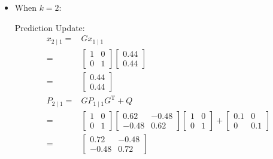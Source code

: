\documentclass[twoside]{article}
\renewcommand{\t}{^\mathrm{T}{}}
\begin{document}
\begin{itemize}
\begin{align*}
\begin{array}{c}
	\end{array}\right]\\
	P_{1\mid 1} =& P_{1\mid 0} - K_1 S_{1\mid 0}K_1\t\\
	 =& \left[ \begin{array}{cc}
	 	1.1 & 0 \\ 0 & 1.1
	 \end{array}\right]-2.5\left[ \begin{array}{c}
	 0.44 \\ 0.44
	 \end{array}\right]\left[ \begin{array}{cc}
	 0.44 & 0.44
	\end{array}\right]\\
	=&	\left[ \begin{array}{cc}
		0.62 & -0.48 \\ -0.48 & 0.62
	\end{array}\right]
	\end{align*}
\item When $k = 2$:

Prediction Update:
\begin{align*}
	x_{2\mid 1} =& G x_{1\mid 1}\\
	=& \left[ \begin{array}{cc}
		1 & 0 \\ 0 & 1
	\end{array}\right] \left[ \begin{array}{c}
		0.44 \\ 0.44
	\end{array}\right] \\
	=&\left[ \begin{array}{c}
		0.44 \\ 0.44
	\end{array}\right] \\
	P_{2\mid 1} =& G P_{1\mid 1} G\t + Q\\
	=& \left[ \begin{array}{cc}
		1 & 0 \\ 0 & 1
	\end{array}\right]\left[ \begin{array}{cc}
		0.62 & -0.48 \\ -0.48 & 0.62
	\end{array}\right]\left[ \begin{array}{cc}
		1 & 0 \\ 0 & 1
	\end{array}\right]+\left[ \begin{array}{cc}
		0.1 & 0 \\ 0 & 0.1
	\end{array}\right]\\
	=& \left[ \begin{array}{cc}
		0.72 & -0.48 \\ -0.48 & 0.72
	\end{array}\right]
\end{align*}


\end{itemize}
\end{document}

